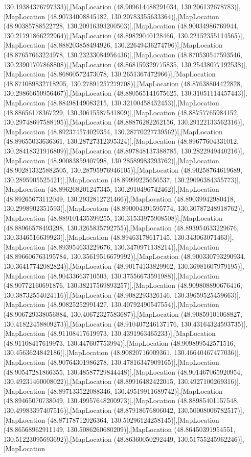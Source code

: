 130.19384376797333)],[MapLocation (48.909614488291034, 130.206132678783)],[MapLocation (48.90734008845182, 130.20783355633364)],[MapLocation (48.90385788522728, 130.20916393200503)],[MapLocation (48.90034986769944, 130.21791866222964)],[MapLocation (48.89829040128466, 130.22152355114565)],[MapLocation (48.888203858494926, 130.22649436274796)],[MapLocation (48.87657663224978, 130.23233084956436)],[MapLocation (48.870530547593546, 130.23901707868808)],[MapLocation (48.868159329775835, 130.25438077192538)],[MapLocation (48.86860572473078, 130.2651367472966)],[MapLocation (48.871089832718205, 130.27891257279708)],[MapLocation (48.87638804422828, 130.29866650956467)],[MapLocation (48.880565141675625, 130.31051114457443)],[MapLocation (48.88498149083215, 130.32100458452453)],[MapLocation (48.88656178367229, 130.30615587541809)],[MapLocation (48.88757765984152, 130.29748697588195)],[MapLocation (48.88876282262156, 130.29122133562316)],[MapLocation (48.892374574029354, 130.28770227739562)],[MapLocation (48.89655033636361, 130.28727312395324)],[MapLocation (48.89677604331012, 130.28418321916809)],[MapLocation (48.897848137388785, 130.2822949440216)],[MapLocation (48.90083859407998, 130.28589983293762)],[MapLocation (48.902813325882505, 130.28795976946105)],[MapLocation (48.90258764619689, 130.2895905525421)],[MapLocation (48.89999225656537, 130.29096384355773)],[MapLocation (48.896268201247345, 130.2910496742462)],[MapLocation (48.89265673112049, 130.2932812721466)],[MapLocation (48.89039942980418, 130.2998902351593)],[MapLocation (48.890004391595774, 130.30787248918762)],[MapLocation (48.889101435399255, 130.31533975908508)],[MapLocation (48.88966578493298, 130.3265835792755)],[MapLocation (48.893954633229676, 130.3346516639923)],[MapLocation (48.89463178617145, 130.343063071463)],[MapLocation (48.893954633229676, 130.3470971138214)],[MapLocation (48.896606763195784, 130.35619516679992)],[MapLocation (48.900330793290934, 130.36417742082824)],[MapLocation (48.90174133829962, 130.36981607979195)],[MapLocation (48.90433663710503, 130.37556673591988)],[MapLocation (48.90772160691876, 130.38217569893257)],[MapLocation (48.909808890676416, 130.38732554024116)],[MapLocation (48.9082293326146, 130.39659525459663)],[MapLocation (48.90825252991427, 130.40792490547554)],[MapLocation (48.906729338056884, 130.40672327583687)],[MapLocation (48.90859101068827, 130.41822458809273)],[MapLocation (48.910407246137176, 130.43164324593735)],[MapLocation (48.91108417619973, 130.4391963465233)],[MapLocation (48.91108417619973, 130.447607753994)],[MapLocation (48.909899542571516, 130.4563624842186)],[MapLocation (48.90820716009361, 130.46640467477036)],[MapLocation (48.90764301986278, 130.47816347909165)],[MapLocation (48.90547281866355, 130.48587729844448)],[MapLocation (48.901467065920954, 130.49231460008022)],[MapLocation (48.89916482422015, 130.4927100269316)],[MapLocation (48.897133522088346, 130.49519911689742)],[MapLocation (48.89465070738049, 130.49957648200973)],[MapLocation (48.88985401157548, 130.49983397407516)],[MapLocation (48.87918676806042, 130.50008006782517)],[MapLocation (48.87178712026364, 130.50296124258145)],[MapLocation (48.86568962911149, 130.5086260680209)],[MapLocation (48.86450391954551, 130.51223095693692)],[MapLocation (48.86360050292449, 130.51755245962246)],[MapLocation 